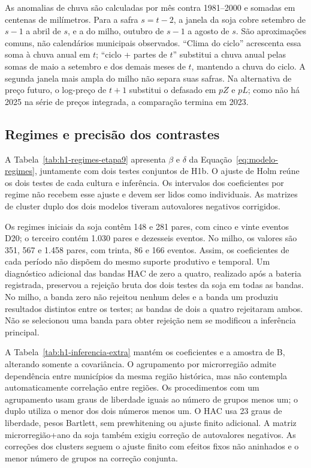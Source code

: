
\FloatBarrier

\FloatBarrier

\FloatBarrier

As anomalias de chuva são calculadas por mês contra 1981--2000 e somadas em centenas de milímetros. Para a safra $s=t-2$, a janela da soja cobre setembro de $s-1$ a abril de $s$, e a do milho, outubro de $s-1$ a agosto de $s$. São aproximações comuns, não calendários municipais observados. ``Clima do ciclo'' acrescenta essa soma à chuva anual em $t$; ``ciclo + partes de $t$'' substitui a chuva anual pelas somas de maio a setembro e dos demais meses de $t$, mantendo a chuva do ciclo. A segunda janela mais ampla do milho não separa suas safras. Na alternativa de preço futuro, o log-preço de $t+1$ substitui o defasado em $pZ$ e $pL$; como não há 2025 na série de preços integrada, a comparação termina em 2023.

\subsection{Regimes e precisão dos contrastes}

A Tabela~\ref{tab:h1-regimes-etapa9} apresenta $\beta$ e $\delta$ da Equação~\eqref{eq:modelo-regimes}, juntamente com dois testes conjuntos de H1b. O ajuste de Holm reúne os dois testes de cada cultura e inferência. Os intervalos dos coeficientes por regime não recebem esse ajuste e devem ser lidos como individuais. As matrizes de cluster duplo dos dois modelos tiveram autovalores negativos corrigidos.


\FloatBarrier

Os regimes iniciais da soja contêm 148 e 281 pares, com cinco e vinte eventos D20; o terceiro contém 1.030 pares e dezesseis eventos. No milho, os valores são 351, 567 e 1.458 pares, com trinta, 86 e 166 eventos. Assim, os coeficientes de cada período não dispõem do mesmo suporte produtivo e temporal. Um diagnóstico adicional das bandas HAC de zero a quatro, realizado após a bateria registrada, preservou a rejeição bruta dos dois testes da soja em todas as bandas. No milho, a banda zero não rejeitou nenhum deles e a banda um produziu resultados distintos entre os testes; as bandas de dois a quatro rejeitaram ambos. Não se selecionou uma banda para obter rejeição nem se modificou a inferência principal.

A Tabela~\ref{tab:h1-inferencia-extra} mantém os coeficientes e a amostra de B, alterando somente a covariância. O agrupamento por microrregião admite dependência entre municípios da mesma região histórica, mas não contempla automaticamente correlação entre regiões. Os procedimentos com um agrupamento usam graus de liberdade iguais ao número de grupos menos um; o duplo utiliza o menor dos dois números menos um. O HAC usa 23 graus de liberdade, pesos Bartlett, sem prewhitening ou ajuste finito adicional. A matriz microrregião+ano da soja também exigiu correção de autovalores negativos. As correções dos clusters seguem o ajuste finito com efeitos fixos não aninhados e o menor número de grupos na correção conjunta.

